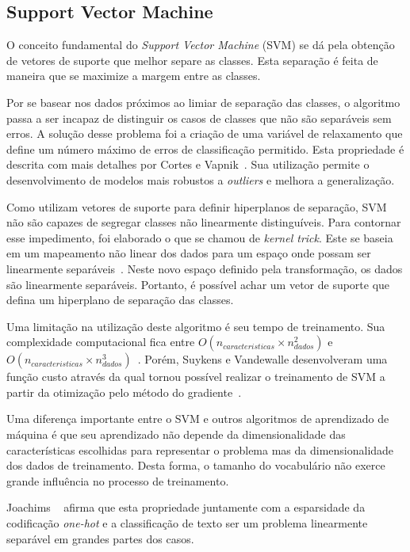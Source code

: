 \subsection{Support Vector Machine}

O conceito fundamental do \textit{Support Vector Machine} (SVM) se dá pela obtenção de vetores de suporte que melhor
separe as classes.
Esta separação é feita de maneira que se maximize a margem entre as classes.

Por se basear nos dados próximos ao limiar de separação das classes, o algoritmo passa a ser incapaz de distinguir os
casos de classes que não são separáveis sem erros.
A solução desse problema foi a criação de uma variável de relaxamento que define um número máximo de erros de
classificação permitido.
Esta propriedade é descrita com mais detalhes por Cortes e Vapnik~\cite{cortes95}.
Sua utilização permite o desenvolvimento de modelos mais robustos a \textit{outliers} e melhora a generalização.

Como utilizam vetores de suporte para definir hiperplanos de separação, SVM não são capazes de segregar classes não
linearmente distinguíveis.
Para contornar esse impedimento, foi elaborado o que se chamou de \textit{kernel trick}.
Este se baseia em um mapeamento não linear dos dados para um espaço onde possam ser linearmente
separáveis~\cite{scholkopf02}.
Neste novo espaço definido pela transformação, os dados são linearmente separáveis.
Portanto, é possível achar um vetor de suporte que defina um hiperplano de separação das classes.

Uma limitação na utilização deste algoritmo é seu tempo de treinamento. Sua complexidade computacional fica entre
$O(n_{caracteristicas} \times n_{dados}^2)$ e $O(n_{caracteristicas} \times n_{dados}^3)$~\cite{list09}.
Porém, Suykens e Vandewalle desenvolveram uma função custo através da qual tornou possível realizar o treinamento de SVM
a partir da otimização pelo método do gradiente~\cite{suykens99}.

Uma diferença importante entre o SVM e outros algoritmos de aprendizado de máquina é que seu aprendizado não depende
da dimensionalidade das características escolhidas para representar o problema mas da dimensionalidade dos dados de
treinamento.
Desta forma, o tamanho do vocabulário não exerce grande influência no processo de treinamento.

Joachims ~\cite{joachims98} afirma que esta propriedade juntamente com a esparsidade da codificação \textit{one-hot}
e a classificação de texto ser um problema linearmente separável em grandes partes dos casos.

